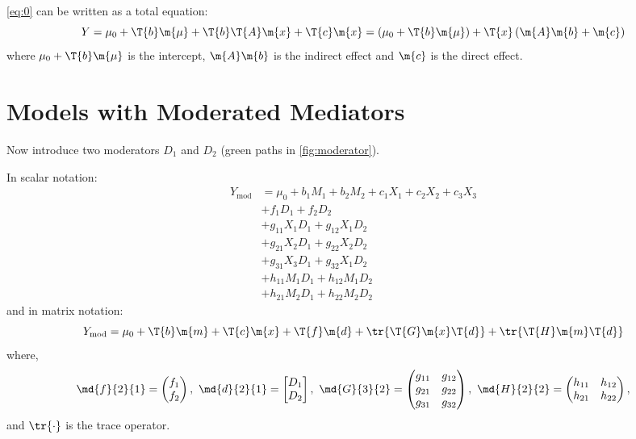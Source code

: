 \cref{eq:0} can be written as a total equation:
\begin{equation}\label{eq:tot0}
    Y = \mu_0 + \T{b}\m{\mu} + \T{b}\T{A}\m{x} + \T{c}\m{x} = \left( \mu_0 + \T{b}\m{\mu} \right) + \T{x} \left( \m{A}\m{b} + \m{c} \right)
\end{equation}
where $\mu_0 + \T{b}\m{\mu}$ is the intercept, $\m{A}\m{b}$ is the indirect effect and $\m{c}$ is the direct effect.

\section{Models with Moderated Mediators}

Now introduce two moderators $D_1$ and $D_2$ (green paths in \cref{fig:moderator}).

In scalar notation:
\begin{equation*}
    \begin{aligned}
        Y_\text{mod} &= \mu_0 + b_1M_1 + b_2M_2 + c_1X_1 + c_2X_2 + c_3X_3\\
        &+ f_1D_1 + f_2D_2\\
        &+ g_{11}X_1D_1 + g_{12}X_1D_2\\
        &+ g_{21}X_2D_1 + g_{22}X_2D_2\\
        &+ g_{31}X_3D_1 + g_{32}X_1D_2\\
        &+ h_{11}M_1D_1 + h_{12}M_1D_2\\
        &+ h_{21}M_2D_1 + h_{22}M_2D_2
    \end{aligned}
\end{equation*}
and in matrix notation:
\begin{equation}\label{eq:mod}
    Y_\text{mod} = \mu_0 + \T{b}\m{m} + \T{c}\m{x} + \T{f}\m{d} + \tr{\T{G}\m{x}\T{d}} + \tr{\T{H}\m{m}\T{d}}
\end{equation}
where,
\begin{equation*}
    \md{f}{2}{1} =
        \begin{pmatrix}
            f_1\\
            f_2
        \end{pmatrix},\ 
    \md{d}{2}{1} =
        \begin{bmatrix}
            D_1\\
            D_2
        \end{bmatrix},\ 
    \md{G}{3}{2} =
        \begin{pmatrix}
            g_{11}  &g_{12}\\
            g_{21}  &g_{22}\\
            g_{31}  &g_{32}
        \end{pmatrix},\ 
    \md{H}{2}{2} =
    \begin{pmatrix}
        h_{11}  &h_{12}\\
        h_{21}  &h_{22}
    \end{pmatrix},
\end{equation*}
and $\tr{\cdot}$ is the trace operator.

